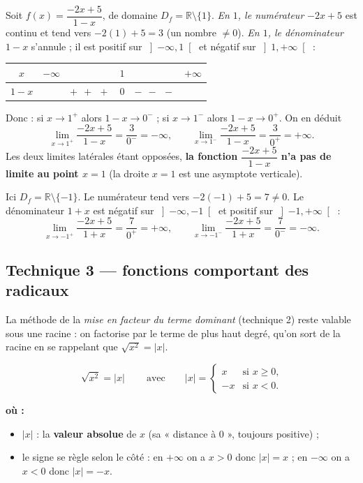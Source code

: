 \documentclass[11pt,a4paper]{article}
\newenvironment{ou}{%
  \par\smallskip\noindent\textbf{où :}\nopagebreak
  \begin{itemize}[leftmargin=1.8em,topsep=2pt,itemsep=1.5pt,parsep=0pt]}%
  {\end{itemize}}
\newcommand{\R}{\mathbb{R}}
\begin{document}
\begin{exemple}
Soit $f(x)=\dfrac{-2x+5}{1-x}$, de domaine $D_f=\R\setminus\{1\}$.
\emph{En $1$, le numérateur} $-2x+5$ est continu et tend vers $-2(1)+5=3$ (un nombre $\neq 0$).
\emph{En $1$, le dénominateur} $1-x$ s'annule ; il est positif sur $\left]-\infty,1\right[$ et
négatif sur $\left]1,+\infty\right[$ :

\begin{center}
\renewcommand{\arraystretch}{1.3}
\begin{tabular}{c|ccccc}
\toprule
$x$ & $-\infty$ & & $1$ & & $+\infty$\\
\midrule
$1-x$ & & $+\ \ +\ \ +$ & $0$ & $-\ \ -\ \ -$ & \\
\bottomrule
\end{tabular}
\end{center}

\noindent Donc : si $x\to 1^{+}$ alors $1-x\to 0^{-}$ ; si $x\to 1^{-}$ alors $1-x\to 0^{+}$. On en déduit
\[ \lim_{x\to 1^{+}}\frac{-2x+5}{1-x}=\frac{3}{0^{-}}=-\infty,\qquad
   \lim_{x\to 1^{-}}\frac{-2x+5}{1-x}=\frac{3}{0^{+}}=+\infty. \]
Les deux limites latérales étant opposées, \textbf{la fonction $\dfrac{-2x+5}{1-x}$ n'a pas de
limite au point $x=1$} (la droite $x=1$ est une asymptote verticale).
\end{exemple}

\begin{exemple}
Ici $D_f=\R\setminus\{-1\}$. Le numérateur tend vers $-2(-1)+5=7\neq 0$. Le dénominateur $1+x$
est négatif sur $\left]-\infty,-1\right[$ et positif sur $\left]-1,+\infty\right[$ :
\[ \lim_{x\to -1^{+}}\frac{-2x+5}{1+x}=\frac{7}{0^{+}}=+\infty,\qquad
   \lim_{x\to -1^{-}}\frac{-2x+5}{1+x}=\frac{7}{0^{-}}=-\infty. \]
\end{exemple}

\subsection{Technique 3 — fonctions comportant des radicaux}

La méthode de la \emph{mise en facteur du terme dominant} (technique 2) reste valable sous une
racine : on factorise par le terme de plus haut degré, qu'on sort de la racine en se rappelant que
$\sqrt{x^2}=|x|$.

\begin{formule}
\[ \boxed{\ \sqrt{x^{2}}=|x|\ }\qquad\text{avec}\qquad |x|=\begin{cases} x & \text{si }x\geq 0,\\[2pt] -x & \text{si }x<0.\end{cases} \]
\begin{ou}
  \item $|x|$ : la \textbf{valeur absolue} de $x$ (sa « distance à $0$ », toujours positive) ;
  \item le signe se règle selon le côté : en $+\infty$ on a $x>0$ donc $|x|=x$ ; en $-\infty$ on a $x<0$ donc $|x|=-x$.
\end{ou}
\end{formule}
\end{document}
